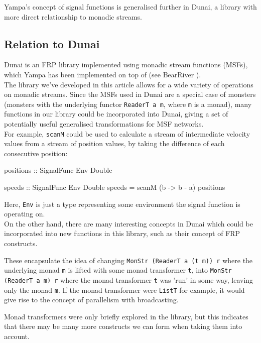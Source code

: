 Yampa's concept of signal functions is generalised further in Dunai, a library with more direct relationship to monadic streams.

\subsection{Relation to Dunai}

Dunai \cite{frp_refactored}\cite{dunai} is an FRP library implemented using monadic stream functions (MSFs), which Yampa has been implemented on top of (see BearRiver \cite{bearriver}). \\

The library we've developed in this article allows for a wide variety of operations on monadic streams. Since the MSFs used in Dunai are a special case of monsters (monsters with the underlying functor \verb+ReaderT a m+, where \verb+m+ is a monad), many functions in our library could be incorporated into Dunai, giving a set of potentially useful generalised transformations for MSF networks. \\

For example, \verb+scanM+ could be used to calculate a stream of intermediate velocity values from a stream of position values, by taking the difference of each consecutive position:
\begin{haskell}
positions :: SignalFunc Env Double 

speeds :: SignalFunc Env Double 
speeds = scanM (\a b -> b - a) positions
\end{haskell}

Here, \verb+Env+ is just a type representing some environment the signal function is operating on. \\

On the other hand, there are many interesting concepts in Dunai which could be incorporated into new functions in this library, such as their concept of FRP constructs. 

These encapsulate the idea of changing \verb+MonStr (ReaderT a (t m)) r+ where the underlying monad \verb+m+ is lifted with some monad transformer \verb+t+, into \newline \verb+MonStr (ReaderT a m) r+ where the monad transformer \verb+t+ was 'run' in some way, leaving only the monad \verb+m+. If the monad transformer were \verb+ListT+ for example, it would give rise to the concept of parallelism with broadcasting. 

Monad transformers were only briefly explored in the library, but this indicates that there may be many more constructs we can form when taking them into account. \\

